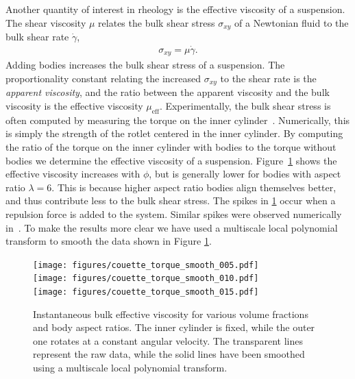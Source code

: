 \documentclass[preprint, 10pt]{elsarticle}
\begin{document}
Another quantity of interest in rheology is the effective viscosity of a
suspension. The shear viscosity $\mu$ relates the bulk shear stress
$\sigma_{xy}$ of a Newtonian fluid to the bulk shear rate
$\dot{\gamma}$, 
\begin{align*}
  \sigma_{xy} = \mu\dot{\gamma}.
\end{align*}
Adding bodies increases the bulk shear stress of a suspension.  The
proportionality constant relating the increased $\sigma_{xy}$ to the
shear rate is the {\em apparent viscosity}, and the ratio between the
apparent viscosity and the bulk viscosity is the effective viscosity
$\mu_{\text{eff}}$.  Experimentally, the bulk shear stress is often
computed by measuring the torque on the inner cylinder~\cite{Koos2012}.
Numerically, this is simply the strength of the rotlet centered in the
inner cylinder.  By computing the ratio of the torque on the inner
cylinder with bodies to the torque without bodies we determine the
effective viscosity of a suspension.  Figure~\ref{fig:torque} shows the
effective viscosity increases with $\phi$, but is generally lower for
bodies with aspect ratio $\lambda=6$. This is because higher aspect ratio
bodies align themselves better, and thus contribute less to the bulk
shear stress. The spikes in \ref{fig:torque} occur when a repulsion
force is added to the system. Similar spikes were observed numerically
in~\cite{Lu2017}. To make the results more clear we have used a multiscale local polynomial transform to smooth the data shown in Figure \ref{fig:torque}.
\begin{figure}[!h]
\begin{center}
\texttt{[image: figures/couette\_torque\_smooth\_005.pdf]}\\
\texttt{[image: figures/couette\_torque\_smooth\_010.pdf]}\\
\texttt{[image: figures/couette\_torque\_smooth\_015.pdf]}
\end{center}
\caption{Instantaneous bulk effective viscosity for various volume
fractions and body aspect ratios. The inner
cylinder is fixed, while the outer one rotates at a constant angular velocity. The transparent lines represent the raw data, while the solid lines have been smoothed using a multiscale local polynomial transform. }\label{fig:torque}
\end{figure} 
\end{document}

